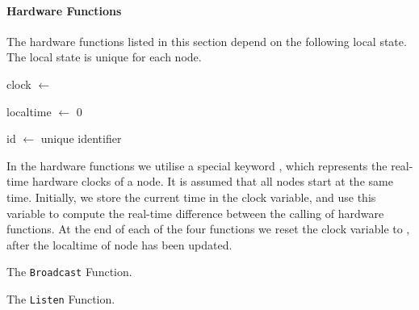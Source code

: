 
\paragraph{Hardware Functions}\label{sec:hwfuncspseudo}
The hardware functions listed in this section depend on the following local state. The local state is unique for each node.\smallbreak

clock $\leftarrow$ \KwNow

localtime $\leftarrow$ 0

id $\leftarrow$ unique identifier \smallbreak

In the hardware functions we utilise a special keyword \singlequote{\KwNow}, which represents the real-time hardware clocks of a node. It is assumed that all nodes start at the same time. Initially, we store the current time in the clock variable, and use this variable to compute the real-time difference between the calling of hardware functions. At the end of each of the four functions we reset the clock variable to \singlequote{\KwNow}, after the localtime of node has been updated.\medbreak

\begin{algorithm}[H]
    \DontPrintSemicolon
    

    \caption{The \texttt{Broadcast} Function.}
    \label{algo:hwfuncstransmit}
\end{algorithm}

\begin{algorithm}[H]
    \DontPrintSemicolon
    
    
    \caption{The \texttt{Listen} Function.}
    \label{algo:hwfuncslisten}
\end{algorithm}

